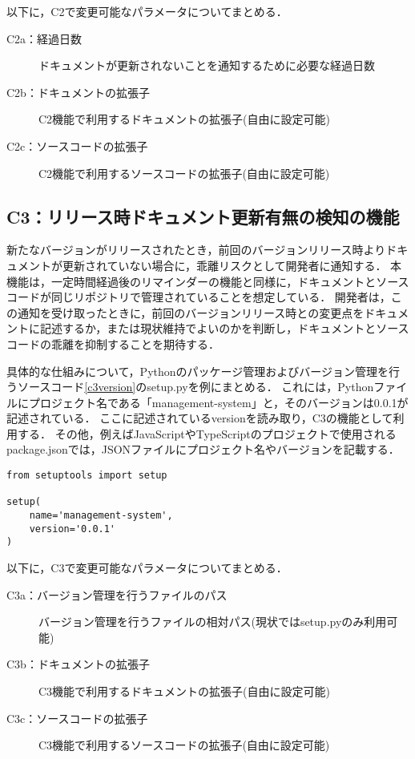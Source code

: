以下に，C2で変更可能なパラメータについてまとめる．
\begin{description}
    \item[C2a：経過日数] ドキュメントが更新されないことを通知するために必要な経過日数
    \item[C2b：ドキュメントの拡張子] C2機能で利用するドキュメントの拡張子(自由に設定可能)
    \item[C2c：ソースコードの拡張子] C2機能で利用するソースコードの拡張子(自由に設定可能)
\end{description}

\subsection{C3：リリース時ドキュメント更新有無の検知の機能}
\label{c3}
新たなバージョンがリリースされたとき，前回のバージョンリリース時よりドキュメントが更新されていない場合に，乖離リスクとして開発者に通知する．
本機能は，一定時間経過後のリマインダーの機能と同様に，ドキュメントとソースコードが同じリポジトリで管理されていることを想定している．
開発者は，この通知を受け取ったときに，前回のバージョンリリース時との変更点をドキュメントに記述するか，または現状維持でよいのかを判断し，ドキュメントとソースコードの乖離を抑制することを期待する．

具体的な仕組みについて，Pythonのパッケージ管理およびバージョン管理を行うソースコード\ref{c3version}のsetup.pyを例にまとめる．
これには，Pythonファイルにプロジェクト名である「management-system」と，そのバージョンは0.0.1が記述されている．
ここに記述されているversionを読み取り，C3の機能として利用する．
その他，例えばJavaScriptやTypeScriptのプロジェクトで使用されるpackage.jsonでは，JSONファイルにプロジェクト名やバージョンを記載する．

\begin{lstlisting}[caption=setup.py, label=c3version]
from setuptools import setup

setup(
    name='management-system',
    version='0.0.1'
)    
\end{lstlisting}

以下に，C3で変更可能なパラメータについてまとめる．
\begin{description}
    \item[C3a：バージョン管理を行うファイルのパス] バージョン管理を行うファイルの相対パス(現状ではsetup.pyのみ利用可能)
    \item[C3b：ドキュメントの拡張子] C3機能で利用するドキュメントの拡張子(自由に設定可能)
    \item[C3c：ソースコードの拡張子] C3機能で利用するソースコードの拡張子(自由に設定可能)
\end{description}

